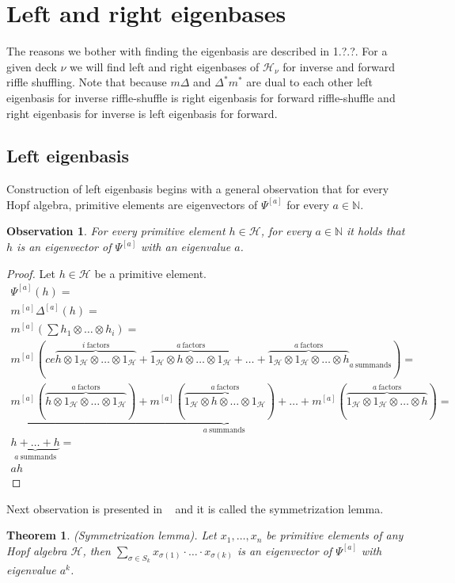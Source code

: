 \documentclass[a4paper, 12pt]{article}
\newtheorem{observation}{Observation}
\newtheorem{theorem}{Theorem}
\begin{document}
\section{Left and right eigenbases}

The reasons we bother with finding the eigenbasis are described in 1.?.?. For a given deck $\nu$
we will find left and right eigenbases of $\mathcal{H}_\nu$ for inverse and forward riffle shuffling.
Note that because
$m\Delta$ and $\Delta^*m^*$ are dual to each other left eigenbasis for inverse riffle-shuffle is right
eigenbasis for forward riffle-shuffle and right eigenbasis for inverse is left eigenbasis for forward.

\subsection{Left eigenbasis}
Construction of left eigenbasis begins with a general observation that for every Hopf algebra,
primitive elements are eigenvectors of $\Psi^{[a]}$ for every $a \in \mathbb{N}$.
\begin{observation}
For every primitive element $h \in \mathcal{H}$, for every $a \in \mathbb{N}$ it holds that $h$ is an
eigenvector of $\Psi^{[a]}$ with an eigenvalue $a$.
\end{observation}
\begin{proof}
Let $h \in \mathcal{H}$ be a primitive element.
\begin{gather*}
\Psi^{[a]}(h) = \\ m^{[a]}\Delta^{[a]}(h) = \\
m^{[a]}(\sum h_1 \otimes \dots \otimes h_i) = \\
m^{[a]}(ce{\overbrace{h \otimes 1_\mathcal{H} \otimes \dots \otimes 1_\mathcal{H}}^{i\
\mathrm{factors}} +
\overbrace{1_\mathcal{H} \otimes h \otimes \dots \otimes 1_\mathcal{H}}^{a\ \mathrm{factors}} +
\dots +
\overbrace{1_\mathcal{H} \otimes 1_\mathcal{H} \otimes \dots \otimes h}^{a\ \mathrm{factors}}}_{a\
\mathrm{summands}} ) = \\
\underbrace{m^{[a]}(\overbrace{h \otimes 1_\mathcal{H} \otimes \dots \otimes 1_\mathcal{H}}^{a\
\mathrm{factors}}) +
m^{[a]}(\overbrace{1_\mathcal{H} \otimes h \otimes \dots \otimes 1_\mathcal{H}}^{a\ \mathrm{factors}}) +
\dots +
m^{[a]}(\overbrace{1_\mathcal{H} \otimes 1_\mathcal{H} \otimes \dots \otimes h}^{a\ \mathrm{factors}})}_{a\
\mathrm{summands}} = \\
\underbrace{h + \dots + h}_{a\ \mathrm{summands}} = \\
ah
\end{gather*}

\end{proof}
Next observation is presented in ~\cite{Diaconis2014} and it is called the symmetrization lemma.
\begin{theorem}
(Symmetrization lemma). Let $x_1, \dots, x_n$ be primitive elements of any Hopf algebra $\mathcal{H}$, then
$\displaystyle\sum_{\sigma \in S_k} x_{\sigma(1)}\cdot\ldots\cdot x_{\sigma(k)}$ is an eigenvector of
$\Psi^{[a]}$ with eigenvalue $a^k$.
\end{theorem}
\end{document}
